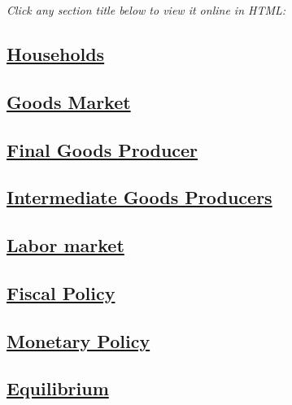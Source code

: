\documentclass[titlepage, headings=optiontotocandhead]{econark} %
\begin{document}
\medskip
\noindent\textit{Click any section title below to view it online in HTML:}

\medskip

\subsection{\href{https://econ-ark.github.io/HAFiscal/\#sec:hank-households}{Households}}
\label{sec:hank-households}

\subsection{\href{https://econ-ark.github.io/HAFiscal/\#sec:goods-market}{Goods Market}}
\label{sec:goods-market}

\subsection{\href{https://econ-ark.github.io/HAFiscal/\#sec:hank-final-goods-producer}{Final Goods Producer}}
\label{sec:hank-final-goods-producer}

\subsection{\href{https://econ-ark.github.io/HAFiscal/\#sec:hank-intermediate-goods-producers}{Intermediate Goods Producers}}
\label{sec:hank-intermediate-goods-producers}

\subsection{\href{https://econ-ark.github.io/HAFiscal/\#sec:hank-labor-market}{Labor market}}
\label{sec:hank-labor-market}

\subsection{\href{https://econ-ark.github.io/HAFiscal/\#sec:hank-fiscal-policy}{Fiscal Policy}}
\label{sec:hank-fiscal-policy}

\subsection{\href{https://econ-ark.github.io/HAFiscal/\#sec:hank-monetary-policy}{Monetary Policy}}
\label{sec:hank-monetary-policy}

\subsection{\href{https://econ-ark.github.io/HAFiscal/\#sec:hank-equilibrium}{Equilibrium}}
\label{sec:hank-equilibrium}
\end{document}
